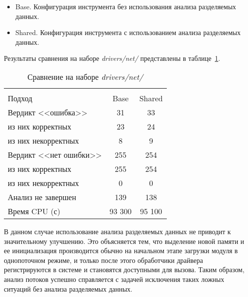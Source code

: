 \begin{itemize}
\item Base. Конфигурация инструмента без использования анализа разделяемых данных.
\item Shared. Конфигурация инструмента с использованием анализа разделяемых данных.
\end{itemize}

Результаты сравнения на наборе \textit{drivers/net/} представлены в таблице~\ref{table-drivers-shared}.

  \begin{table}[h]\footnotesize \centering
    \caption{Сравнение на наборе \textit{drivers/net/}}
  	\label{table-drivers-shared}
    \begin{tabular}{ | l | c | c |}
      \hline
      		& 		\multicolumn{2}{c|}{\combatmode}  \\
      Подход         				& Base 	& Shared 	\\ \hline
      Вердикт <<ошибка>> 			& 31   	& 33    	\\ 
  \hspace{0.5cm} из них корректных 	& 23 	& 24 		\\ 
  \hspace{0.5cm} из них некорректных & 8 	& 9 		\\ \hline
      Вердикт <<нет ошибки>>  		& 255   & 254    	\\ 
  \hspace{0.5cm} из них корректных 	& 255 	& 254    	\\
  \hspace{0.5cm} из них некорректных & 0 	& 0    		\\ \hline
      Анализ не завершен       		& 139    & 138     	\\ \hline
      Время CPU (с)   				& 93 300 & 95 100  	\\ 
      \hline
    \end{tabular}
  \end{table}

В данном случае использование анализа разделяемых данных не приводит к значительному улучшению.
Это объясняется тем, что выделение новой памяти и ее инициализация производится обычно на начальном этапе загрузки модуля в однопоточном режиме, и только после этого обработчики драйвера регистрируются в системе и становятся доступными для вызова. 
Таким образом, анализ потоков успешно справляется с задачей исключения таких ложных ситуаций без анализа разделяемых данных.


